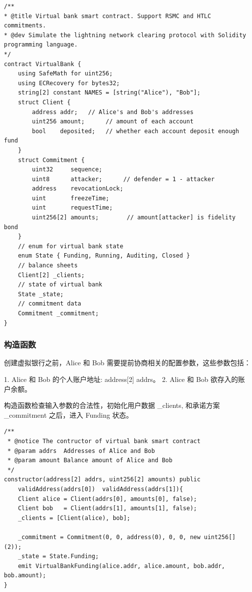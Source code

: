 \begin{lstlisting}[caption={虚拟银行智能合约数据结构.}, label={lst:data}]
/**
* @title Virtual bank smart contract. Support RSMC and HTLC commitments.
* @dev Simulate the lightning network clearing protocol with Solidity programming language.
*/
contract VirtualBank {
    using SafeMath for uint256;
    using ECRecovery for bytes32;
    string[2] constant NAMES = [string("Alice"), "Bob"];
    struct Client {
        address addr;   // Alice's and Bob's addresses
        uint256 amount;      // amount of each account
        bool    deposited;   // whether each account deposit enough fund
    }
    struct Commitment {
        uint32     sequence;
        uint8      attacker;      // defender = 1 - attacker
        address    revocationLock;
        uint       freezeTime;
        uint       requestTime;
        uint256[2] amounts;        // amount[attacker] is fidelity bond
    }
    // enum for virtual bank state
    enum State { Funding, Running, Auditing, Closed }
    // balance sheets
    Client[2] _clients;
    // state of virtual bank
    State _state;
    // commitment data
    Commitment _commitment;
}
\end{lstlisting}


\subsubsection{构造函数}

创建虚拟银行之前，Alice 和 Bob 需要提前协商相关的配置参数，这些参数包括：

1. Alice 和 Bob 的个人账户地址: address[2] addrs。
2. Alice 和 Bob 欲存入的账户余额。

构造函数检查输入参数的合法性，初始化用户数据 \_clients, 和承诺方案 \_commitment 之后，进入 Funding 状态。

\begin{lstlisting}[caption={构造函数.}, label={lst:constructor}]
/**
 * @notice The contructor of virtual bank smart contract
 * @param addrs  Addresses of Alice and Bob
 * @param amount Balance amount of Alice and Bob
 */
constructor(address[2] addrs, uint256[2] amounts) public 
    validAddress(addrs[0])  validAddress(addrs[1]){
    Client alice = Client(addrs[0], amounts[0], false);
    Client bob   = Client(addrs[1], amounts[1], false);
    _clients = [Client(alice), bob];
    
    _commitment = Commitment(0, 0, address(0), 0, 0, new uint256[](2));
    _state = State.Funding;
    emit VirtualBankFunding(alice.addr, alice.amount, bob.addr, bob.amount);
}
\end{lstlisting}

